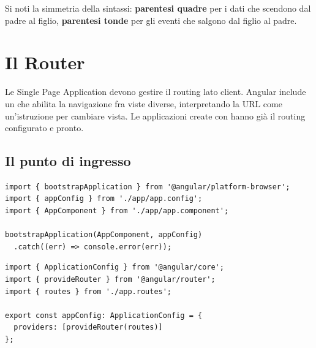 Si noti la simmetria della sintassi: \textbf{parentesi quadre} per i dati che
scendono dal padre al figlio, \textbf{parentesi tonde} per gli eventi che
salgono dal figlio al padre.

\section{Il Router}

Le Single Page Application devono gestire il routing lato client. Angular
include un  che abilita la navigazione fra viste diverse,
interpretando la URL come un'istruzione per cambiare vista. Le applicazioni
create con  hanno già il routing configurato e pronto.

\subsection{Il punto di ingresso}

\begin{lstlisting}[style=ts, name=src/main.ts]
import { bootstrapApplication } from '@angular/platform-browser';
import { appConfig } from './app/app.config';
import { AppComponent } from './app/app.component';

bootstrapApplication(AppComponent, appConfig)
  .catch((err) => console.error(err));
\end{lstlisting}

\begin{affianco}[0.46][c]
\begin{lstlisting}[style=ts, name=src/app/app.config.ts]
import { ApplicationConfig } from '@angular/core';
import { provideRouter } from '@angular/router';
import { routes } from './app.routes';

export const appConfig: ApplicationConfig = {
  providers: [provideRouter(routes)]
};
\end{lstlisting}
\risultato
\begin{immagine}
\end{immagine}
\end{affianco}

